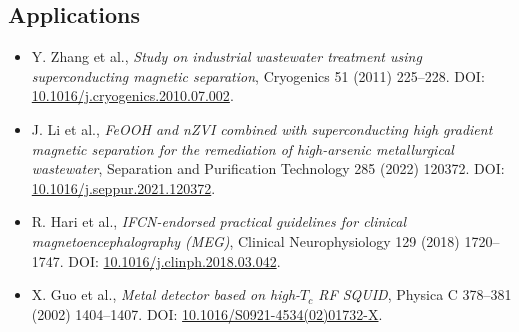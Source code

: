 \documentclass[11pt,a4paper]{article}
\begin{document}
\subsection{Applications}
\begin{itemize}
  \item Y. Zhang et al., \textit{Study on industrial wastewater treatment using superconducting magnetic separation}, Cryogenics 51 (2011) 225--228. DOI: \href{https://doi.org/10.1016/j.cryogenics.2010.07.002}{10.1016/j.cryogenics.2010.07.002}.
  \item J. Li et al., \textit{FeOOH and nZVI combined with superconducting high gradient magnetic separation for the remediation of high-arsenic metallurgical wastewater}, Separation and Purification Technology 285 (2022) 120372. DOI: \href{https://doi.org/10.1016/j.seppur.2021.120372}{10.1016/j.seppur.2021.120372}.
  \item R. Hari et al., \textit{IFCN-endorsed practical guidelines for clinical magnetoencephalography (MEG)}, Clinical Neurophysiology 129 (2018) 1720--1747. DOI: \href{https://doi.org/10.1016/j.clinph.2018.03.042}{10.1016/j.clinph.2018.03.042}.
  \item X. Guo et al., \textit{Metal detector based on high-$T_c$ RF SQUID}, Physica C 378--381 (2002) 1404--1407. DOI: \href{https://doi.org/10.1016/S0921-4534(02)01732-X}{10.1016/S0921-4534(02)01732-X}.
\end{itemize}
\end{document}
